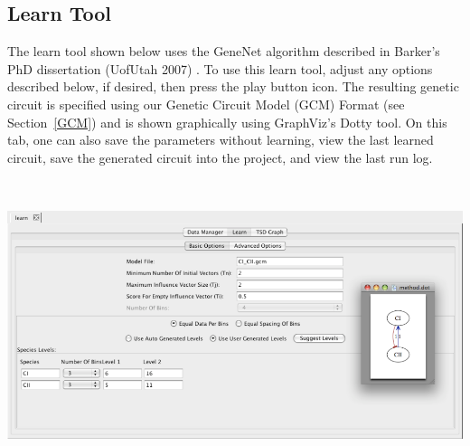 \documentclass[titlepage,11pt]{article}
\begin{document}
\subsection{\label{learnTool}Learn Tool}

\noindent
The learn tool shown below uses the GeneNet algorithm described in
Barker's PhD dissertation (UofUtah 2007)
. To use this learn tool, adjust
any options described below, if desired, then press the play button
icon.  The resulting genetic circuit is specified using
our Genetic Circuit Model (GCM) Format (see Section~\ref{GCM}) and is shown
graphically using GraphViz's Dotty tool. On this tab, one can also 
save the parameters without learning, view the last learned 
circuit, save the generated circuit into the project, and view the last run
log. 
\begin{center}
\includegraphics[height=85mm]{screenshots/learn}
\end{center}
\end{document}
